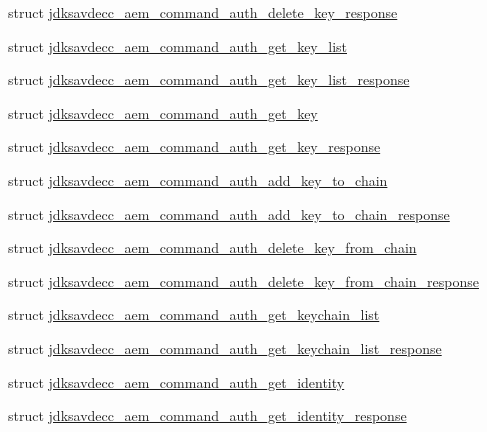 \begin{DoxyCompactItemize}
\item 
struct \hyperlink{structjdksavdecc__aem__command__auth__delete__key__response}{jdksavdecc\+\_\+aem\+\_\+command\+\_\+auth\+\_\+delete\+\_\+key\+\_\+response}
\item 
struct \hyperlink{structjdksavdecc__aem__command__auth__get__key__list}{jdksavdecc\+\_\+aem\+\_\+command\+\_\+auth\+\_\+get\+\_\+key\+\_\+list}
\item 
struct \hyperlink{structjdksavdecc__aem__command__auth__get__key__list__response}{jdksavdecc\+\_\+aem\+\_\+command\+\_\+auth\+\_\+get\+\_\+key\+\_\+list\+\_\+response}
\item 
struct \hyperlink{structjdksavdecc__aem__command__auth__get__key}{jdksavdecc\+\_\+aem\+\_\+command\+\_\+auth\+\_\+get\+\_\+key}
\item 
struct \hyperlink{structjdksavdecc__aem__command__auth__get__key__response}{jdksavdecc\+\_\+aem\+\_\+command\+\_\+auth\+\_\+get\+\_\+key\+\_\+response}
\item 
struct \hyperlink{structjdksavdecc__aem__command__auth__add__key__to__chain}{jdksavdecc\+\_\+aem\+\_\+command\+\_\+auth\+\_\+add\+\_\+key\+\_\+to\+\_\+chain}
\item 
struct \hyperlink{structjdksavdecc__aem__command__auth__add__key__to__chain__response}{jdksavdecc\+\_\+aem\+\_\+command\+\_\+auth\+\_\+add\+\_\+key\+\_\+to\+\_\+chain\+\_\+response}
\item 
struct \hyperlink{structjdksavdecc__aem__command__auth__delete__key__from__chain}{jdksavdecc\+\_\+aem\+\_\+command\+\_\+auth\+\_\+delete\+\_\+key\+\_\+from\+\_\+chain}
\item 
struct \hyperlink{structjdksavdecc__aem__command__auth__delete__key__from__chain__response}{jdksavdecc\+\_\+aem\+\_\+command\+\_\+auth\+\_\+delete\+\_\+key\+\_\+from\+\_\+chain\+\_\+response}
\item 
struct \hyperlink{structjdksavdecc__aem__command__auth__get__keychain__list}{jdksavdecc\+\_\+aem\+\_\+command\+\_\+auth\+\_\+get\+\_\+keychain\+\_\+list}
\item 
struct \hyperlink{structjdksavdecc__aem__command__auth__get__keychain__list__response}{jdksavdecc\+\_\+aem\+\_\+command\+\_\+auth\+\_\+get\+\_\+keychain\+\_\+list\+\_\+response}
\item 
struct \hyperlink{structjdksavdecc__aem__command__auth__get__identity}{jdksavdecc\+\_\+aem\+\_\+command\+\_\+auth\+\_\+get\+\_\+identity}
\item 
struct \hyperlink{structjdksavdecc__aem__command__auth__get__identity__response}{jdksavdecc\+\_\+aem\+\_\+command\+\_\+auth\+\_\+get\+\_\+identity\+\_\+response}

\end{DoxyCompactItemize}
